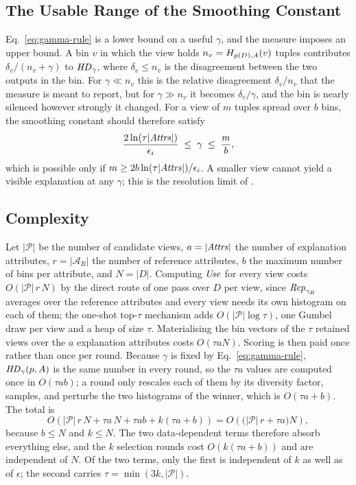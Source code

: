 \subsection{The Usable Range of the Smoothing Constant}
\label{app:gamma-window}

\begin{remark}
\label{rem:gamma-window}
Eq.~\eqref{eq:gamma-rule} is a lower bound on a useful $\gamma$, and the measure imposes an upper bound.
A bin $v$ in which the view holds $n_v=H_{p(D),A}(v)$ tuples contributes $\delta_v/(n_v+\gamma)$ to $\mathit{HD}_\gamma$, where $\delta_v\le n_v$ is the disagreement between the two outputs in the bin.
For $\gamma\ll n_v$ this is the relative disagreement $\delta_v/n_v$ that the measure is meant to report, but for $\gamma\gg n_v$ it becomes $\delta_v/\gamma$, and the bin is nearly silenced however strongly it changed.
For a view of $m$ tuples spread over $b$ bins, the smoothing constant should therefore satisfy
\begin{equation}
\frac{2\ln(\tau|\mathit{Attrs}|)}{\epsilon_i}\;\le\;\gamma\;\le\;\frac{m}{b},
\label{eq:gamma-window}
\end{equation}
which is possible only if $m\ge 2b\ln(\tau|\mathit{Attrs}|)/\epsilon_i$.
A smaller view cannot yield a visible explanation at any $\gamma$; this is the resolution limit of \sys{}.
\end{remark}

\subsection{Complexity}
\label{app:complexity}

Let $|\mathcal{P}|$ be the number of candidate views, $a=|\mathit{Attrs}|$ the number of explanation attributes, $r=|\mathcal{A}_R|$ the number of reference attributes, $b$ the maximum number of bins per attribute, and $N=|D|$.
Computing $\mathit{Use}$ for every view costs $O(|\mathcal{P}|\,r\,N)$ by the direct route of one pass over $D$ per view, since $\mathit{Rep}_{\gamma_R}$ averages over the reference attributes and every view needs its own histogram on each of them; the one-shot top-$\tau$ mechanism adds $O(|\mathcal{P}|\log\tau)$, one Gumbel draw per view and a heap of size $\tau$.
Materialising the bin vectors of the $\tau$ retained views over the $a$ explanation attributes costs $O(\tau a N)$.
Scoring is then paid once rather than once per round.
Because $\gamma$ is fixed by Eq.~\eqref{eq:gamma-rule}, $\mathit{HD}_\gamma(p,A)$ is the same number in every round, so the $\tau a$ values are computed once in $O(\tau a b)$; a round only rescales each of them by its diversity factor, samples, and perturbs the two histograms of the winner, which is $O(\tau a+b)$.
The total is
\[
O\!\left(|\mathcal{P}|\,r\,N + \tau a\, N + \tau a b + k(\tau a + b)\right)
= O\!\left(\big(|\mathcal{P}|\,r + \tau a\big)N\right),
\]
because $b\le N$ and $k\le N$.
The two data-dependent terms therefore absorb everything else, and the $k$ selection rounds cost $O(k(\tau a+b))$ and are independent of $N$.
Of the two terms, only the first is independent of $k$ as well as of $\epsilon$; the second carries $\tau=\min(3k,|\mathcal{P}|)$.

